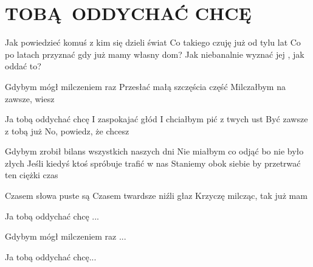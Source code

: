 \documentclass[../../../songbook.tex]{subfiles}
\begin{document}
\TabPositions{9cm} %
\section*{TOBĄ ODDYCHAĆ CHCĘ}
{}
\vspace{0.5cm}
Jak powiedzieć komuś z kim się dzieli świat		 \newline
Co takiego czuję już od tylu lat				 \newline
Co po latach przyznać gdy już mamy własny dom?	 \newline
Jak niebanalnie wyznać jej , jak oddać to?		 \newline

Gdybym mógł milczeniem raz		 \newline
Przesłać małą szczęścia część	 \newline
Milczałbym na zawsze, wiesz		 \newline

\-\hspace{1cm} Ja tobą oddychać chcę		 \newline
\-\hspace{1cm} I zaspokajać głód			 \newline
\-\hspace{1cm} I chciałbym pić z twych ust	 \newline
\-\hspace{1cm} Być zawsze z tobą już		 \newline
\-\hspace{1cm} No, powiedz, że chcesz		 \newline

Gdybym zrobił bilans wszystkich naszych dni  \newline
Nie miałbym co odjąć bo nie było złych  \newline
Jeśli kiedyś ktoś spróbuje trafić w nas  \newline
Staniemy obok siebie by przetrwać ten ciężki czas  \newline

Czasem słowa puste są  \newline
Czasem twardsze niźli głaz  \newline
Krzyczę milcząc, tak już mam  \newline

\-\hspace{1cm} Ja tobą oddychać chcę ... \newline

Gdybym mógł milczeniem raz ... \newline

\-\hspace{1cm} Ja tobą oddychać chcę... \newline
\end{document}
